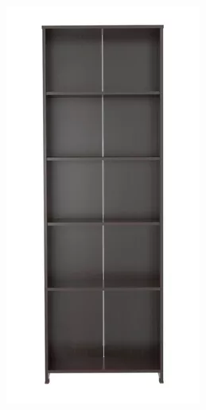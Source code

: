 \begin{frame}[fragile]
\begin{columns}
\begin{center}
\includegraphics[width=0.95\linewidth]{00_ComportamientoAplicacionTicTacToe//Librero.png}    
\end{center}
\end{columns}


\end{frame}





